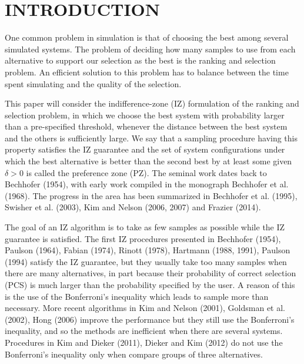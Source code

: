\documentclass{wscpaperproc}
\theoremstyle{wsc}
\begin{document}
\section{INTRODUCTION}
\label{sec:intro}

One common problem in simulation is that of choosing the best among
several simulated systems. The problem of deciding how many samples
to use from each alternative to support our selection as the best
is the ranking and selection problem. An efficient solution to this
problem has to balance between the time spent simulating and the quality
of the selection.

This paper will consider the indifference-zone (IZ) formulation of
the ranking and selection problem, in which we choose the best system
with probability larger than a pre-specified threshold, whenever the
distance between the best system and the others is sufficiently large.
We say that a sampling procedure having this property satisfies the
IZ guarantee and the set of system configurations under which the
best alternative is better than the second best by at least some given
$\delta>0$ is called the preference zone (PZ). The seminal work dates
back to Bechhofer (1954), with early work compiled in the monograph
Bechhofer et al. (1968). The progress in the area has been summarized
in Bechhofer et al. (1995), Swisher et al. (2003), Kim and Nelson
(2006, 2007) and Frazier (2014).

The goal of an IZ algorithm is to take as few samples as possible
while the IZ guarantee is satisfied. The first IZ procedures presented
in Bechhofer (1954), Paulson (1964), Fabian (1974), Rinott (1978),
Hartmann (1988, 1991), Paulson (1994) satisfy the IZ guarantee, but
they usually take too many samples when there are many alternatives,
in part because their probability of correct selection (PCS) is much
larger than the probability specified by the user. A reason of this
is the use of the Bonferroni's inequality which leads to sample more
than necessary. More recent algorithms in Kim and Nelson (2001), Goldsman
et al. (2002), Hong (2006) improve the performance but they still
use the Bonferroni's inequality, and so the methods are inefficient
when there are several systems. Procedures in Kim and Dieker (2011),
Dieker and Kim (2012) do not use the Bonferroni's inequality only
when compare groups of three alternatives. 
\end{document}
